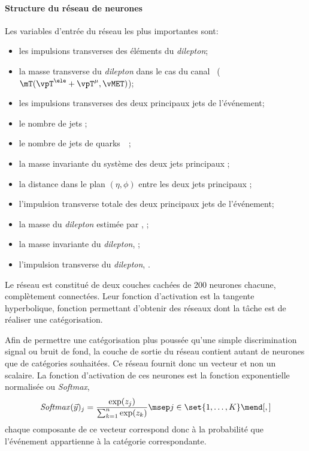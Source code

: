 \paragraph{Structure du réseau de neurones}
Les variables d'entrée du réseau les plus importantes sont:
\begin{itemize}
\item les impulsions transverses des éléments du \emph{dilepton};
\item la masse transverse du \emph{dilepton} dans le cas du canal \ele\mu\ ($\mT(\vpT^{\ele}+\vpT^{\mu},\vMET)$);
\item les impulsions transverses des deux principaux jets de l'événement;
\item le nombre de jets \Njets;
\item le nombre de jets de quarks~\quarkb\ \Nbjets;
\item la masse invariante du système des deux jets principaux \mjj;
\item la distance dans le plan $(\eta,\phi)$ entre les deux jets principaux \Detajj;
\item l'impulsion transverse totale des deux principaux jets de l'événement;
\item la masse du \emph{dilepton} estimée par \SVFIT, \msv;
\item la masse invariante du \emph{dilepton}, \mvis;
\item l'impulsion transverse du \emph{dilepton}, \pTvis.
\end{itemize}
Le réseau est constitué de deux couches cachées de 200 neurones chacune, complètement connectées.
Leur fonction d'activation est la tangente hyperbolique, fonction permettant d'obtenir des réseaux dont la tâche est de réaliser une catégorisation.
\par
Afin de permettre une catégorisation plus poussée qu'une simple discrimination signal ou bruit de fond, la couche de sortie du réseau contient autant de neurones que de catégories souhaitées.
Ce réseau fournit donc un vecteur et non un scalaire.
La fonction d'activation de ces neurones est la fonction exponentielle normalisée ou \emph{Softmax},
\begin{equation}
\mathit{Softmax}(\vec{y})_j = \frac{\exp(z_j)}{\sum_{k=1}^n \exp(z_k)}
\msep
j\in\set{1,\ldots,K}
\mend[,]
\end{equation}
chaque composante de ce vecteur correspond donc à la probabilité que l'événement appartienne à la catégorie correspondante.
